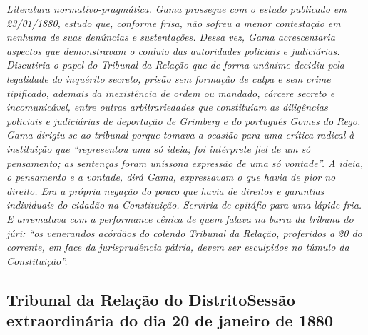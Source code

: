 \begin{resumo}
\emph{Literatura normativo-pragmática. Gama prossegue com o estudo
publicado em 23/01/1880, estudo que, conforme frisa, não sofreu a menor
contestação em nenhuma de suas denúncias e sustentações. Dessa vez, Gama
acrescentaria aspectos que demonstravam o conluio das autoridades
policiais e judiciárias. Discutiria o papel do Tribunal da Relação que
de forma unânime decidiu pela legalidade do inquérito secreto, prisão
sem formação de culpa e sem crime tipificado, ademais da inexistência de
ordem ou mandado, cárcere secreto e incomunicável, entre outras
arbitrariedades que constituíam as diligências policiais e judiciárias de
deportação de Grimberg e do português Gomes do Rego. Gama dirigiu-se ao
tribunal porque tomava a ocasião para uma crítica radical à instituição
que ``representou uma só ideia; foi intérprete fiel de
um só pensamento; as sentenças foram uníssona expressão de uma só
vontade''. A ideia, o pensamento e a vontade, dirá Gama, expressavam o
que havia de pior no direito. Era a própria negação do pouco que havia
de direitos e garantias individuais do cidadão na Constituição. Serviria
de epitáfio para uma lápide fria. E arrematava com a performance cênica
de quem falava na barra da tribuna do júri: ``os venerandos acórdãos do
colendo Tribunal da Relação, proferidos a 20 do corrente, em face da
jurisprudência pátria, devem ser esculpidos no túmulo da Constituição''.
}
\end{resumo}

\subsection{Tribunal da Relação do Distrito\break Sessão extraordinária do dia 20 de janeiro de 1880}

